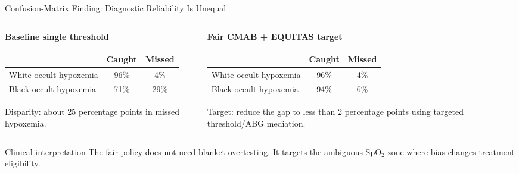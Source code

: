 \documentclass[aspectratio=169,10pt]{beamer}
\begin{document}
\begin{frame}{Confusion-Matrix Finding: Diagnostic Reliability Is Unequal}
\begin{columns}[T]
\begin{column}{0.48\textwidth}
\textbf{Baseline single threshold}
\begin{center}
\small
\begin{tabular}{lcc}
\toprule
 & Caught & Missed \\
\midrule
White occult hypoxemia & 96\% & 4\% \\
Black occult hypoxemia & 71\% & 29\% \\
\bottomrule
\end{tabular}
\end{center}
\vspace{0.4em}
\alert{Disparity:} about 25 percentage points in missed hypoxemia.
\end{column}
\begin{column}{0.48\textwidth}
\textbf{Fair CMAB + EQUITAS target}
\begin{center}
\small
\begin{tabular}{lcc}
\toprule
 & Caught & Missed \\
\midrule
White occult hypoxemia & 96\% & 4\% \\
Black occult hypoxemia & 94\% & 6\% \\
\bottomrule
\end{tabular}
\end{center}
\vspace{0.4em}
\alert{Target:} reduce the gap to less than 2 percentage points using targeted threshold/ABG mediation.
\end{column}
\end{columns}

\vspace{0.6em}
\begin{block}{Clinical interpretation}
The fair policy does not need blanket overtesting. It targets the ambiguous SpO$_2$ zone where bias changes treatment eligibility.
\end{block}
\end{frame}
\end{document}
